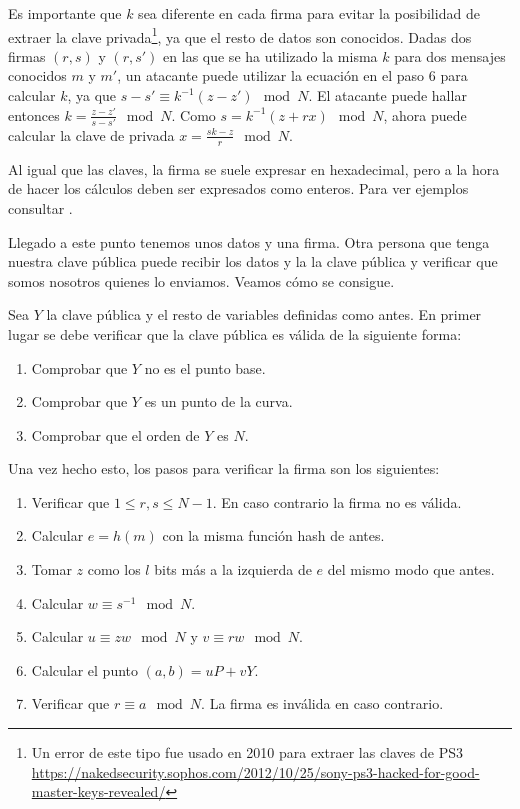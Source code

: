 \documentclass[twoside]{article}
\theoremstyle{definition}
\begin{document}
Es importante que $k$ sea diferente en cada firma para evitar la posibilidad de extraer la clave privada\footnote{Un error de este tipo fue usado en 2010 para extraer las claves de PS3 \url{https://nakedsecurity.sophos.com/2012/10/25/sony-ps3-hacked-for-good-master-keys-revealed/}}, ya que el resto de datos son conocidos. Dadas dos firmas $(r,s)$ y $(r,s')$ en las que se ha utilizado la misma $k$ para dos mensajes conocidos $m$ y $m'$, un atacante puede utilizar la ecuación en el paso 6 para calcular $k$, ya que $s-s'\equiv k^{-1}(z-z')\mod N$. El atacante puede hallar entonces $k=\frac{z-z'}{s-s'}\mod N$. Como $s=k^{-1}(z+rx)\mod N$, ahora puede calcular la clave de privada $x=\frac{sk-z}{r}\mod N$. 

Al igual que las claves, la firma se suele expresar en hexadecimal, pero a la hora de hacer los cálculos deben ser expresados como enteros. Para ver ejemplos consultar \cite{Eric}.

Llegado a este punto tenemos unos datos y una firma. Otra persona que tenga nuestra clave pública puede recibir los datos y la la clave pública y verificar que somos nosotros quienes lo enviamos. Veamos cómo se consigue.

Sea $Y$ la clave pública y el resto de variables definidas como antes. En primer lugar se debe verificar que la clave pública es válida de la siguiente forma:
\begin{enumerate}
\item Comprobar que $Y$ no es el punto base.
\item Comprobar que $Y$ es un punto de la curva.
\item Comprobar que el orden de $Y$ es $N$.
\end{enumerate}
Una vez hecho esto, los pasos para verificar la firma son los siguientes: 
\begin{enumerate}
\item Verificar que $1\leq r,s\leq N-1$. En caso contrario la firma no es válida.
\item Calcular $e=h(m)$ con la misma función hash de antes.
\item Tomar $z$ como los $l$ bits más a la izquierda de $e$ del mismo modo que antes.
\item Calcular $w\equiv s^{-1}\mod N$.
\item Calcular $u\equiv zw\mod N$ y $v\equiv rw\mod N$. 
\item Calcular el punto $(a,b)=uP+vY$.
\item Verificar que $r\equiv a\mod N$. La firma es inválida en caso contrario.
\end{enumerate}
\end{document}
